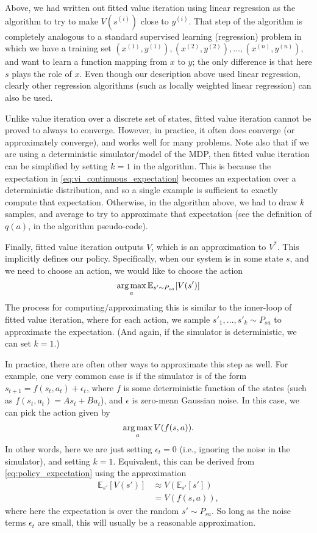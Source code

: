 Above, we had written out fitted value iteration using linear regression
as the algorithm to try to make $V(s^{(i)})$ close to $y^{(i)}$. That step of the
algorithm is completely analogous to a standard supervised learning (regression)
problem in which we have a training set $(x^{(1)},y^{(1)}),(x^{(2)},y^{(2)}),\ldots,(x^{(n)},y^{(n)})$,
and want to learn a function mapping from $x$ to $y$; the only difference is that
here $s$ plays the role of $x$. Even though our description above used linear
regression, clearly other regression algorithms (such as locally weighted linear
regression) can also be used.

Unlike value iteration over a discrete set of states, fitted value iteration
cannot be proved to always to converge. However, in practice, it often does
converge (or approximately converge), and works well for many problems.
Note also that if we are using a deterministic simulator/model of the MDP,
then fitted value iteration can be simplified by setting $k = 1$ in the algorithm.
This is because the expectation in \cref{eq:vi_continuous_expectation} becomes an expectation over
a deterministic distribution, and so a single example is sufficient to exactly
compute that expectation. Otherwise, in the algorithm above, we had to
draw $k$ samples, and average to try to approximate that expectation (see the
definition of $q(a)$, in the algorithm pseudo-code).

Finally, fitted value iteration outputs $V$, which is an approximation to
$V^*$. This implicitly defines our policy. Specifically, when our system is in
some state $s$, and we need to choose an action, we would like to choose the
action
\begin{equation}\label{eq:policy_expectation}
    \argmax_a \mathbb E_{s'\sim P_{sa}}[V(s')]
\end{equation}
The process for computing/approximating this is similar to the inner-loop of
fitted value iteration, where for each action, we sample $s'_1,\ldots,s'_k \sim P_{sa}$ to
approximate the expectation. (And again, if the simulator is deterministic,
we can set $k = 1$.)

In practice, there are often other ways to approximate this step as well.
For example, one very common case is if the simulator is of the form $s_{t+1} =
f(s_t ,a_t) + \epsilon_t$, where $f$ is some deterministic function of the states (such as
$f(s_t ,a_t ) = As_t + Ba_t$), and $\epsilon$ is zero-mean Gaussian noise. In this case, we
can pick the action given by
\[
    \argmax_a V(f(s,a)).
\]
In other words, here we are just setting $\epsilon_t = 0$ (i.e., ignoring the noise in
the simulator), and setting $k = 1$. Equivalent, this can be derived from \cref{eq:policy_expectation} using the approximation
\begin{align}
    \mathbb E_{s'}[V (s')] &\approx V(\mathbb E_{s'}[s'])\label{eq:approx_expected_value}\\
                           &= V(f(s,a)), \label{eq:approx_expected_value_f}
\end{align}
where here the expectation is over the random $s'\sim P_{sa}$. So long as the noise
terms $\epsilon_t$ are small, this will usually be a reasonable approximation.

